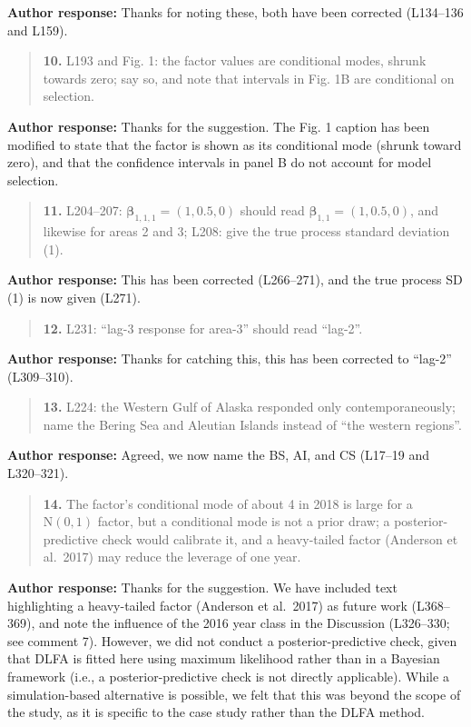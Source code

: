 \documentclass[11pt]{article}
\begin{document}
\textbf{Author response:} Thanks for noting these, both have been
corrected (L134--136 and L159).

\begin{quote}
\textbf{10.} L193 and Fig. 1: the factor values are conditional modes,
shrunk towards zero; say so, and note that intervals in Fig. 1B are
conditional on selection.
\end{quote}

\textbf{Author response:} Thanks for the suggestion. The Fig. 1 caption
has been modified to state that the factor is shown as its conditional
mode (shrunk toward zero), and that the confidence intervals in panel B
do not account for model selection.

\begin{quote}
\textbf{11.} L204--207: \(\boldsymbol{\beta}_{1,1,1} = (1, 0.5, 0)\)
should read \(\boldsymbol{\beta}_{1,1} = (1, 0.5, 0)\), and likewise for
areas 2 and 3; L208: give the true process standard deviation (1).
\end{quote}

\textbf{Author response:} This has been corrected (L266--271), and the
true process SD (1) is now given (L271).

\begin{quote}
\textbf{12.} L231: ``lag-3 response for area-3'' should read ``lag-2''.
\end{quote}

\textbf{Author response:} Thanks for catching this, this has been
corrected to ``lag-2'' (L309--310).

\begin{quote}
\textbf{13.} L224: the Western Gulf of Alaska responded only
contemporaneously; name the Bering Sea and Aleutian Islands instead of
``the western regions''.
\end{quote}

\textbf{Author response:} Agreed, we now name the BS, AI, and CS
(L17--19 and L320--321).

\begin{quote}
\textbf{14.} The factor's conditional mode of about 4 in 2018 is large
for a \(\mathrm{N}(0,1)\) factor, but a conditional mode is not a prior
draw; a posterior-predictive check would calibrate it, and a
heavy-tailed factor (Anderson et al.~2017) may reduce the leverage of
one year.
\end{quote}

\textbf{Author response:} Thanks for the suggestion. We have included
text highlighting a heavy-tailed factor (Anderson et al.~2017) as future
work (L368--369), and note the influence of the 2016 year class in the
Discussion (L326--330; see comment 7). However, we did not conduct a
posterior-predictive check, given that DLFA is fitted here using maximum
likelihood rather than in a Bayesian framework (i.e., a
posterior-predictive check is not directly applicable). While a
simulation-based alternative is possible, we felt that this was beyond
the scope of the study, as it is specific to the case study rather than
the DLFA method.
\end{document}
